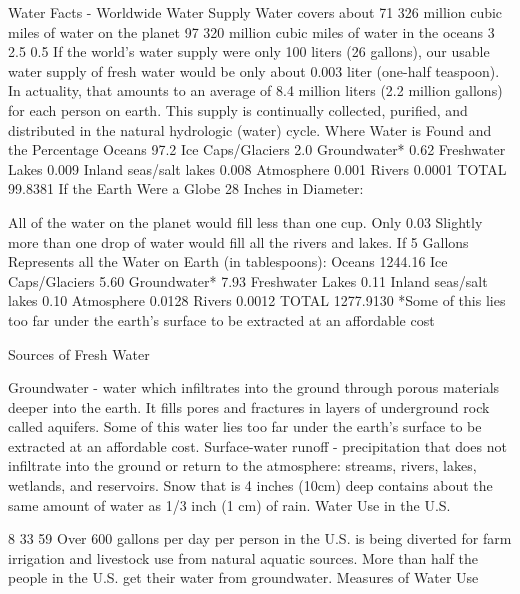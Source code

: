 \documentclass{article}
\begin{document}
Water Facts - Worldwide Water Supply
Water covers about 71%
326 million cubic miles of water on the planet
97%
320 million cubic miles of water in the oceans
3%
2.5%
0.5%
If the world's water supply were only 100 liters (26 gallons), our usable water supply of fresh water would be only about 0.003 liter (one-half teaspoon).
In actuality, that amounts to an average of 8.4 million liters (2.2 million gallons) for each person on earth.
This supply is continually collected, purified, and distributed in the natural hydrologic (water) cycle.
Where Water is Found and the Percentage
Oceans	97.2%
Ice Caps/Glaciers	2.0%
Groundwater*	0.62%
Freshwater Lakes	0.009%
Inland seas/salt lakes	0.008%
Atmosphere	0.001%
Rivers	0.0001%
TOTAL	99.8381%
If the Earth Were a Globe 28 Inches in Diameter:

All of the water on the planet would fill less than one cup.
Only 0.03%
Slightly more than one drop of water would fill all the rivers and lakes.
If 5 Gallons Represents all the Water on Earth (in tablespoons):
Oceans	1244.16
Ice Caps/Glaciers	5.60
Groundwater*	7.93
Freshwater Lakes	0.11
Inland seas/salt lakes	0.10
Atmosphere	0.0128
Rivers	0.0012
TOTAL	1277.9130
*Some of this lies too far under the earth's surface to be extracted at an affordable cost

Sources of Fresh Water

Groundwater - water which infiltrates into the ground through porous materials deeper into the earth. It fills pores and fractures in layers of underground rock called aquifers. Some of this water lies too far under the earth's surface to be extracted at an affordable cost.
Surface-water runoff - precipitation that does not infiltrate into the ground or return to the atmosphere: streams, rivers, lakes, wetlands, and reservoirs.
Snow that is 4 inches (10cm) deep contains about the same amount of water as 1/3 inch (1 cm) of rain.
Water Use in the U.S.

8%
33%
59%
Over 600 gallons per day per person in the U.S. is being diverted for farm irrigation and livestock use from natural aquatic sources.
More than half the people in the U.S. get their water from groundwater.
Measures of Water Use
\end{document}
